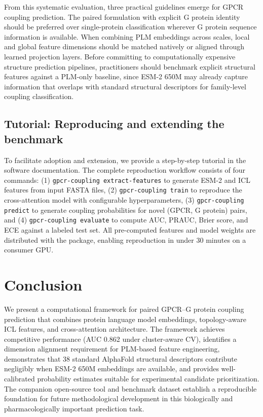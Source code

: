 \documentclass[11pt,a4paper]{article}
\begin{document}
From this systematic evaluation, three practical guidelines emerge for GPCR coupling prediction. The paired formulation with explicit G protein identity should be preferred over single-protein classification wherever G protein sequence information is available. When combining PLM embeddings across scales, local and global feature dimensions should be matched natively or aligned through learned projection layers. Before committing to computationally expensive structure prediction pipelines, practitioners should benchmark explicit structural features against a PLM-only baseline, since ESM-2 650M may already capture information that overlaps with standard structural descriptors for family-level coupling classification.

\subsection{Tutorial: Reproducing and extending the benchmark}

To facilitate adoption and extension, we provide a step-by-step tutorial in the software documentation. The complete reproduction workflow consists of four commands: (1) \texttt{gpcr-coupling extract-features} to generate ESM-2 and ICL features from input FASTA files, (2) \texttt{gpcr-coupling train} to reproduce the cross-attention model with configurable hyperparameters, (3) \texttt{gpcr-coupling predict} to generate coupling probabilities for novel (GPCR, G protein) pairs, and (4) \texttt{gpcr-coupling evaluate} to compute AUC, PRAUC, Brier score, and ECE against a labeled test set. All pre-computed features and model weights are distributed with the package, enabling reproduction in under 30 minutes on a consumer GPU.

\section{Conclusion}

We present a computational framework for paired GPCR--G protein coupling prediction that combines protein language model embeddings, topology-aware ICL features, and cross-attention architecture. The framework achieves competitive performance (AUC 0.862 under cluster-aware CV), identifies a dimension alignment requirement for PLM-based feature engineering, demonstrates that 38 standard AlphaFold structural descriptors contribute negligibly when ESM-2 650M embeddings are available, and provides well-calibrated probability estimates suitable for experimental candidate prioritization. The companion open-source tool and benchmark dataset establish a reproducible foundation for future methodological development in this biologically and pharmacologically important prediction task.
\end{document}
